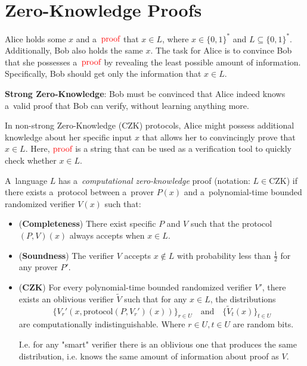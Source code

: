 
\section{Zero-Knowledge Proofs}


Alice holds some $x$ and a~$\textcolor{red}{\text{proof}}$ that $x \in L$, where $x \in \{ 0, 1 \}^{*}$ and $L \subseteq  \{ 0, 1 \}^{*}$.
Additionally, Bob also holds the same $x$.
The task for Alice is to convince Bob that she possesses a~$\textcolor{red}{\text{proof}}$ by revealing the least possible amount of information. 
Specifically, Bob should get only the information that $x \in  L$.

\textbf{Strong Zero-Knowledge}: Bob must be convinced that Alice indeed knows a~valid proof that Bob can verify, without learning anything more.

In non-strong Zero-Knowledge (CZK) protocols, Alice might possess additional knowledge about her specific input $x$ that allows her to convincingly prove that $x \in L$. 
Here, $\textcolor{red}{\text{proof}}$ is a string that can be used as a verification tool to quickly check whether $x \in L$.

\begin{definition}
    A~language $L$ has a~\emph{computational zero-knowledge} proof (notation: $L \in \mathrm{CZK}$) if there exists a~protocol between a~prover $P(x)$ and a~polynomial-time bounded randomized verifier $V(x)$ such that:
    \begin{itemize}
        \item (\textbf{Completeness}) There exist specific $P$ and $V$ such that the protocol $(P, V)(x)$ always accepts when $x \in L$.
        
        \item (\textbf{Soundness}) The verifier $V$ accepts $x \not\in L$ with probability less than $\frac{1}{2}$ for any prover $P'$.
        
        \item (\textbf{CZK}) For every polynomial-time bounded randomized verifier $V'$, there exists an oblivious verifier $\tilde{V}$ such that for any $x \in L$, the distributions
        \[
            \{ V_r'(x, \text{protocol}(P, V_r')(x)) \}_{r \in U} \quad \text{and} \quad \{ \tilde{V}_t(x) \}_{t \in U}
        \]
        are computationally indistinguishable. 
	Where $r \in  U, t \in  U$ are random bits.

	I.e. for any "smart" verifier there is an oblivious one that produces the same distribution, i.e. knows the same amount of information about proof as $V$.
    \end{itemize}
\end{definition}


